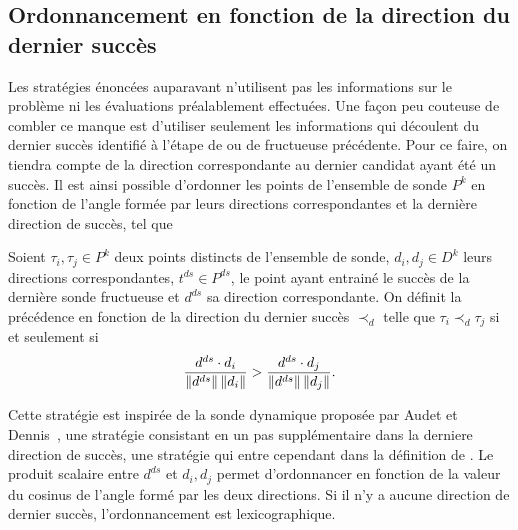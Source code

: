 \subsection{Ordonnancement en fonction de la direction du dernier succès}\label{sec:dds}
Les stratégies énoncées auparavant n'utilisent pas les informations sur le problème ni les évaluations préalablement effectuées. Une façon peu couteuse de combler ce manque est d'utiliser seulement les informations qui découlent du dernier succès identifié à l'étape de \POLL ou de \SEARCH fructueuse précédente. Pour ce faire, on tiendra compte de la direction correspondante au dernier candidat ayant été un succès. Il est ainsi possible d'ordonner les points de l'ensemble de sonde $P^k$ en fonction de l'angle formée par leurs directions correspondantes et la dernière direction de succès, tel que
\begin{definition}
	\label{def:dds}
	Soient $\tau_i,\tau_j \in P^k$ deux points distincts de l'ensemble de sonde, $d_i, d_j \in D^k$ leurs directions correspondantes, $t^{ds} \in P^{ds}$, le point ayant entrainé le succès de la dernière sonde fructueuse et $d^{ds}$ sa direction correspondante. On définit la précédence en fonction de la direction du dernier succès  $\prec_d$ telle que
	$\tau_i \prec_d \tau_j$ si et seulement si
	$$\frac{d^{ds}\cdot d_i}{\left\lVert d^{ds}\right\rVert\left\lVert d_i\right\rVert} > \frac{d^{ds}\cdot d_j}{\left\lVert d^{ds}\right\rVert\left\lVert d_j\right\rVert}.$$	
\end{definition}
Cette stratégie est inspirée de la sonde dynamique proposée par Audet et Dennis~\cite{AuDe2006}, une stratégie consistant en un pas supplémentaire dans la derniere direction de succès, une stratégie qui entre cependant dans la définition de \SEARCH. Le produit scalaire entre $d^{ds}$ et $d_i, d_j$ permet d'ordonnancer en fonction de la valeur du cosinus de l'angle formé par les deux directions. Si il n'y a aucune direction de dernier succès, l'ordonnancement est lexicographique. 
